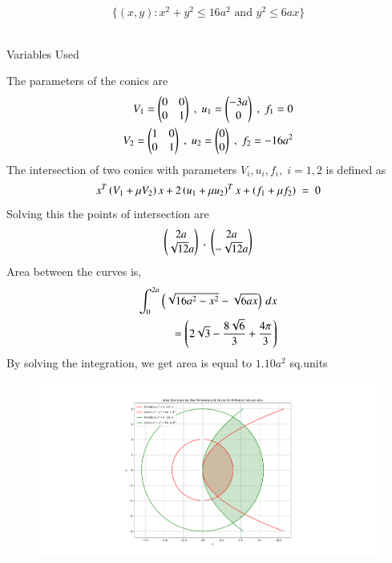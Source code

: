 \documentclass[journal]{IEEEtran}
\begin{document}
\[
\{(x,y) : x^2 + y^2 \leq 16a^2 \text{ and } y^2 \leq 6ax\}
\]
\\
\solution
\begin{table}[h!]    
  \centering
  
  \caption{Variables Used}
  \label{tab1-1.2-20}
\end{table}
The parameters of the conics are
\begin{align}
V_1=\begin{pmatrix}0 & 0 \\ 0 & 1\end{pmatrix}\;,\;u_1=\begin{pmatrix}-3a\\0\end{pmatrix} \;,\;f_1=0\\
V_2=\begin{pmatrix}1 & 0 \\ 0 & 1\end{pmatrix}\;,\;u_2=\begin{pmatrix}0\\0\end{pmatrix}\;,\;f_2=-16a^2
\end{align}
The intersection of two conics with parameters $V_i,u_i,f_i,\;i= 1,2$ is defined as
\begin{align}
x^T\left(V_1+\mu V_2\right)x+2\left(u_1+\mu u_2\right)^T x + \left(f_1+\mu f_2\right)\;=\;0
\end{align}
Solving this the points of intersection are
\begin{align}
\begin{pmatrix}2a\\\sqrt{12}a\end{pmatrix}\;,\;\begin{pmatrix}2a\\-\sqrt{12}a\end{pmatrix}
\end{align}
Area between the curves is,
\begin{align}
\int_{0}^{2a} \left(\sqrt{16a^2-x^2}-\sqrt{6ax}\right) \, dx \\
=\left(2\sqrt{3}-\frac{8\sqrt{6}}{3}+\frac{4\pi}{3}\right)
\end{align}
By solving the integration, we get area is equal to $1.10a^2$ sq.units
\begin{figure}[h!]
   \centering
   \includegraphics[width=\linewidth]{figs/figure_1.png}
   \label{stemplot}
   \caption{}
\end{figure}
\end{document}
